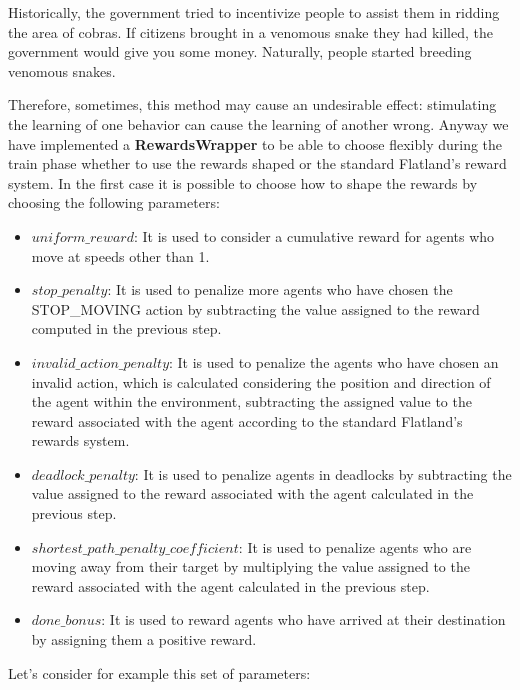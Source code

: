 \documentclass[11pt, a4paper, hidelinks]{report}
\begin{document}
\begin{quoting}[font=itshape, begintext={"}, endtext={ \footnote{https://medium.com/@BonsaiAI/deep-reinforcement-learning-models-tips-tricks-for-writing-reward-functions-a84fe525e8e0}}]
Historically, the government tried to incentivize people to assist them in ridding the area of cobras.
If citizens brought in a venomous snake they had killed, the government would give you some money.
Naturally, people started breeding venomous snakes.
\end{quoting}
Therefore, sometimes, this method may cause an undesirable effect: stimulating the learning of one behavior can cause the learning of another wrong.
Anyway  we have implemented a \textbf{RewardsWrapper} to be able to choose flexibly during the train phase whether to use the rewards shaped or the standard Flatland's reward system.
In the first case it is possible to choose how to shape the rewards by choosing the following parameters:

\begin{itemize}
	\item\textbf{$uniform\_reward$}: It is used to consider a cumulative reward for agents who move at speeds other than 1.
	\item \textbf{$stop\_penalty$}: It is used to penalize more agents who have chosen the STOP\_MOVING action by subtracting the value assigned to the reward computed in the previous step.
	\item \textbf{$invalid\_action\_penalty$}: It is used to penalize the agents who have chosen an invalid action, which is calculated considering the position and direction of the agent within the environment, subtracting the assigned value to the reward associated with the agent according to the standard Flatland's rewards system.
	\item \textbf{$deadlock\_penalty$}: It is used to penalize agents in deadlocks by subtracting the value assigned to the reward associated with the agent calculated in the previous step.
	\item \textbf{$shortest\_path\_penalty\_coefficient$}: It is used to penalize agents who are moving away from their target by multiplying the value assigned to the reward associated with the agent calculated in the previous step.
	\item \textbf{$done\_bonus$}: It is used to reward agents who have arrived at their destination by assigning them a positive reward.
\end{itemize}
Let's consider for example this set of parameters:
\end{document}
